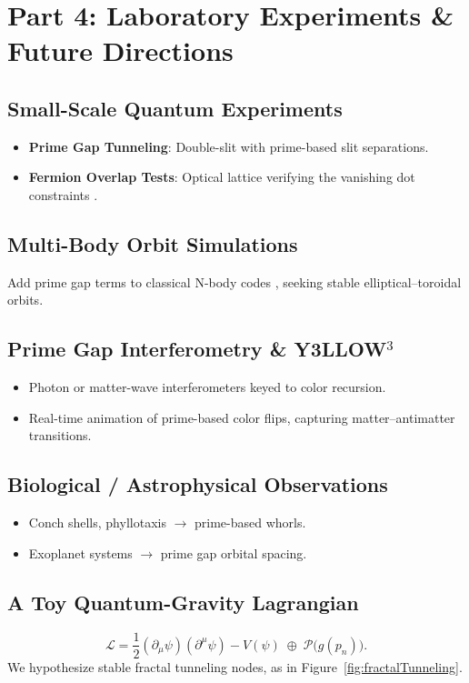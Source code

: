 \documentclass[11pt]{article}
\begin{document}
\section{Part 4: Laboratory Experiments \& Future Directions}
\label{part4}

\subsection{Small-Scale Quantum Experiments}
\begin{itemize}
    \item \textbf{Prime Gap Tunneling}: Double-slit with prime-based slit separations.
    \item \textbf{Fermion Overlap Tests}: Optical lattice verifying the vanishing dot constraints \cite{Pauli1925}.
\end{itemize}

\subsection{Multi-Body Orbit Simulations}
Add prime gap terms to classical N-body codes \cite{Poincare1892}, seeking stable elliptical–toroidal orbits.

\subsection{Prime Gap Interferometry \& Y3LLOW$^3$}
\begin{itemize}
    \item Photon or matter-wave interferometers keyed to color recursion.
    \item Real-time animation of prime-based color flips, capturing matter–antimatter transitions.
\end{itemize}

\subsection{Biological / Astrophysical Observations}
\begin{itemize}
    \item Conch shells, phyllotaxis $\rightarrow$ prime-based whorls.
    \item Exoplanet systems $\rightarrow$ prime gap orbital spacing.
\end{itemize}

\subsection{A Toy Quantum-Gravity Lagrangian}
\[
\mathcal{L} 
= \frac{1}{2}(\partial_\mu \psi)(\partial^\mu \psi) - V(\psi)
\;\oplus\;
\mathcal{P}\bigl(g(p_n)\bigr).
\]
We hypothesize stable fractal tunneling nodes, as in Figure~\ref{fig:fractalTunneling}.
\end{document}
